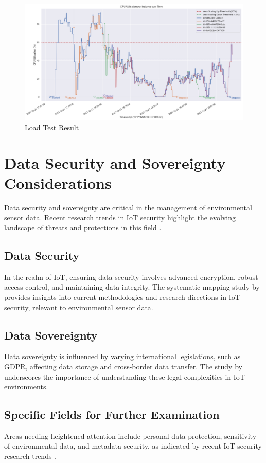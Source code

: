 \documentclass[12pt,oneside]{book} %
\begin{document}
\begin{figure}[H]
    \centering
    \includegraphics[width=1\linewidth]{images/autoscaling-test.png}
    \caption{Load Test Result}\label{fig:load-test-result}
\end{figure}

\newpage
\section{Data Security and Sovereignty Considerations}
Data security and sovereignty are critical in the management of environmental
sensor data. Recent research trends in IoT security highlight the evolving
landscape of threats and protections in this field
\cite{CurrentResearchIoTSecurity2020}.

\subsection{Data Security}
In the realm of IoT, ensuring data security involves advanced encryption,
robust access control, and maintaining data integrity. The systematic mapping
study by \citeauthor{CurrentResearchIoTSecurity2020} provides insights into
current methodologies and research directions in IoT security, relevant to
environmental sensor data.

\subsection{Data Sovereignty}
Data sovereignty is influenced by varying international legislations, such as
GDPR, affecting data storage and cross-border data transfer. The study by
\citeauthor{CurrentResearchIoTSecurity2020} underscores the importance of
understanding these legal complexities in IoT environments.

\subsection{Specific Fields for Further Examination}
Areas needing heightened attention include personal data protection,
sensitivity of environmental data, and metadata security, as indicated by
recent IoT security research trends \cite{CurrentResearchIoTSecurity2020}.
\end{document}
